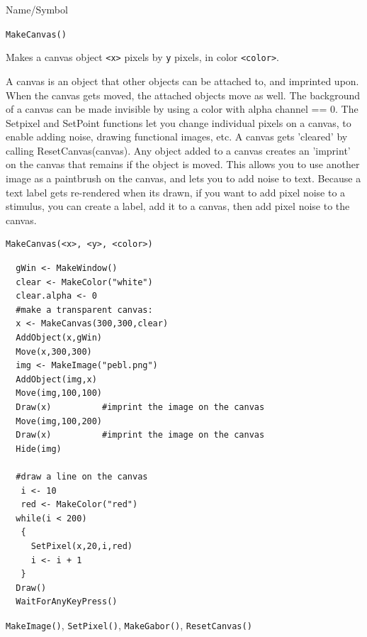 \begin{desc}{Name/Symbol}
\item[Name/Symbol]	\verb+MakeCanvas()+

\item[Description] Makes a canvas object  \verb+<x>+ pixels by
  \verb+y+ pixels, in color \verb+<color>+.

A canvas is an object that other objects can be attached to, and imprinted upon.
When the canvas gets moved, the attached objects move as well. The background of a canvas can be
made invisible by using a color with alpha channel == 0. The Setpixel
and SetPoint functions let you change individual pixels on a canvas,
to enable adding noise, drawing functional images, etc. A canvas gets
'cleared' by calling ResetCanvas(canvas). Any object added to a canvas creates an 'imprint' on the canvas that
remains if the object is moved.  This allows you to use another image
as a paintbrush on the canvas, and lets you to add noise to text.
Because a text label gets re-rendered when its drawn, if you want to
add pixel noise to a stimulus, you can create a label, add it to a
canvas, then add pixel noise to the canvas.

\item[Usage]
\begin{verbatim}
MakeCanvas(<x>, <y>, <color>)
\end{verbatim}

\item[Example]	
\begin{verbatim}
  gWin <- MakeWindow()
  clear <- MakeColor("white")
  clear.alpha <- 0
  #make a transparent canvas:
  x <- MakeCanvas(300,300,clear)  
  AddObject(x,gWin)
  Move(x,300,300)
  img <- MakeImage("pebl.png")
  AddObject(img,x)
  Move(img,100,100)
  Draw(x)          #imprint the image on the canvas
  Move(img,100,200)
  Draw(x)          #imprint the image on the canvas
  Hide(img)

  #draw a line on the canvas
   i <- 10
   red <- MakeColor("red")
  while(i < 200)
   {
     SetPixel(x,20,i,red)
     i <- i + 1
   }
  Draw()
  WaitForAnyKeyPress()
\end{verbatim}
\item[See Also]	\verb+MakeImage()+, \verb+SetPixel()+,
  \verb+MakeGabor()+, \verb+ResetCanvas()+
\end{desc}



